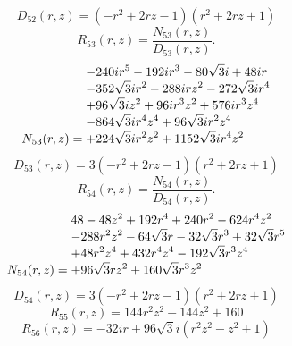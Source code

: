 \documentclass[11pt,a4paper]{article}
\begin{document}
\begin{equation}
D_{52}(r,z)=\left(- r^{2} + 2 r z - 1\right) \left(r^{2} + 2 r z + 1\right)
\label{eq:cat-denominator-52}
\end{equation}
\begin{equation}
R_{53}(r,z)=\frac{N_{53}(r,z)}{D_{53}(r,z)}.
\label{eq:cat-rational-53}
\end{equation}
\begin{equation}
N_{53}(r,z)=\shortstack[l]{$\displaystyle  - 240 i r^{5} - 192 i r^{3} - 80 \sqrt{3} i + 48 i r$\\
$\displaystyle  - 352 \sqrt{3} i r^{2} - 288 i r z^{2} - 272 \sqrt{3} i r^{4}$\\
$\displaystyle  + 96 \sqrt{3} i z^{2} + 96 i r^{3} z^{2} + 576 i r^{3} z^{4}$\\
$\displaystyle  - 864 \sqrt{3} i r^{4} z^{4} + 96 \sqrt{3} i r^{2} z^{4}$\\
$\displaystyle  + 224 \sqrt{3} i r^{2} z^{2} + 1152 \sqrt{3} i r^{4} z^{2}$}
\label{eq:cat-numerator-53}
\end{equation}
\begin{equation}
D_{53}(r,z)=3 \left(- r^{2} + 2 r z - 1\right) \left(r^{2} + 2 r z + 1\right)
\label{eq:cat-denominator-53}
\end{equation}
\begin{equation}
R_{54}(r,z)=\frac{N_{54}(r,z)}{D_{54}(r,z)}.
\label{eq:cat-rational-54}
\end{equation}
\begin{equation}
N_{54}(r,z)=\shortstack[l]{$\displaystyle 48 - 48 z^{2} + 192 r^{4} + 240 r^{2} - 624 r^{4} z^{2}$\\
$\displaystyle  - 288 r^{2} z^{2} - 64 \sqrt{3} r - 32 \sqrt{3} r^{3} + 32 \sqrt{3} r^{5}$\\
$\displaystyle  + 48 r^{2} z^{4} + 432 r^{4} z^{4} - 192 \sqrt{3} r^{3} z^{4}$\\
$\displaystyle  + 96 \sqrt{3} r z^{2} + 160 \sqrt{3} r^{3} z^{2}$}
\label{eq:cat-numerator-54}
\end{equation}
\begin{equation}
D_{54}(r,z)=3 \left(- r^{2} + 2 r z - 1\right) \left(r^{2} + 2 r z + 1\right)
\label{eq:cat-denominator-54}
\end{equation}
\begin{equation}
R_{55}(r,z)=144 r^{2} z^{2} - 144 z^{2} + 160
\label{eq:cat-rational-55}
\end{equation}
\begin{equation}
R_{56}(r,z)=- 32 i r + 96 \sqrt{3} i \left(r^{2} z^{2} - z^{2} + 1\right)
\label{eq:cat-rational-56}
\end{equation}
\end{document}
